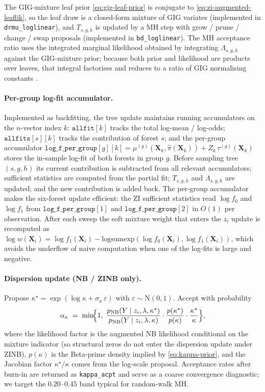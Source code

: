 \documentclass[11pt]{article}
\theoremstyle{plain}
\theoremstyle{definition}
\theoremstyle{remark}
\newcommand{\NB}{\mathrm{NB}}
\newcommand{\N}{\mathrm{N}}
\newcommand{\X}{\mathbf{X}}
\newcommand{\pihat}{\widehat{\pi}}
\newcommand{\fzeroSym}{f_{0}}
\newcommand{\foneSym}{f_{1}}
\newcommand{\zilat}{z_{i}}
\newcommand{\logsumexp}{\mathrm{logsumexp}}
\newcommand{\softw}{w}
\begin{document}
The GIG-mixture leaf prior \eqref{eq:gig-leaf-prior} is conjugate to
\eqref{eq:zi-augmented-leaflik}, so the leaf draw is a closed-form
mixture of GIG variates (implemented in \texttt{drmu\_loglinear}), and
$T_{s,g,h}$ is updated by a MH step with grow / prune / change / swap
proposals (implemented in \texttt{bd\_loglinear}). The MH acceptance
ratio uses the integrated marginal likelihood obtained by integrating
$\Lambda_{s,g,h}$ against the GIG-mixture prior; because both prior
and likelihood are products over leaves, that integral factorises and
reduces to a ratio of GIG normalising constants
\citep[Appendix~A]{murray2021loglinear}.

\paragraph{Per-group log-fit accumulator.}
Implemented as backfitting, the tree update maintains running
accumulators on the $n$-vector index $k$: $\mathtt{allfit}[k]$ tracks
the total log-mean / log-odds; $\mathtt{allfits}[s][k]$ tracks the
contribution of forest $s$; and the per-group accumulator
$\mathtt{log\_f\_per\_group}[g][k] = \mu^{(g)}(\X_k, \pihat(\X_k)) +
Z_k\, \tau^{(g)}(\X_k)$ stores the in-sample log-fit of both forests
in group $g$. Before sampling tree $(s, g, h)$ its current
contribution is subtracted from all relevant accumulators; sufficient
statistics are computed from the partial fit; $T_{s,g,h}$ and
$\Lambda_{s,g,h}$ are updated; and the new contribution is added back.
The per-group accumulator makes the six-forest update efficient: the
ZI sufficient statistics read $\log \fzeroSym$ and $\log \foneSym$
from $\mathtt{log\_f\_per\_group}[1]$ and
$\mathtt{log\_f\_per\_group}[2]$ in $O(1)$ per observation. After
each sweep the soft mixture weight that enters the $\zilat$ update is
recomputed as $\log\softw(\X_i) = \log\foneSym(\X_i) -
\logsumexp(\log\fzeroSym(\X_i), \log\foneSym(\X_i))$, which avoids the
underflow of naive computation when one of the log-fits is large and
negative.

\paragraph{Dispersion update (NB / ZINB only).}
Propose $\kappa^\star = \exp(\log \kappa + \sigma_\kappa\,
\varepsilon)$ with $\varepsilon \sim \N(0, 1)$. Accept with
probability
\begin{equation}
  \alpha_\kappa
  \;=\;
  \min\!\Bigl\{1,\;
    \frac{p_{\NB}(Y \mid \zilat, \lambda, \kappa^\star)}{p_{\NB}(Y \mid \zilat, \lambda, \kappa)}
    \cdot
    \frac{p(\kappa^\star)}{p(\kappa)}
    \cdot
    \frac{\kappa^\star}{\kappa}
  \Bigr\},
  \label{eq:kappa-MH}
\end{equation}
where the likelihood factor is the augmented NB likelihood conditional
on the mixture indicator (so structural zeros do not enter the
dispersion update under ZINB), $p(\kappa)$ is the Beta-prime density
implied by \eqref{eq:kappa-prior}, and the Jacobian factor $\kappa^\star
/ \kappa$ comes from the log-scale proposal. Acceptance rates after
burn-in are returned as \texttt{kappa\_acpt} and serve as a coarse
convergence diagnostic; we target the $0.20$--$0.45$ band typical for
random-walk MH.
\end{document}
